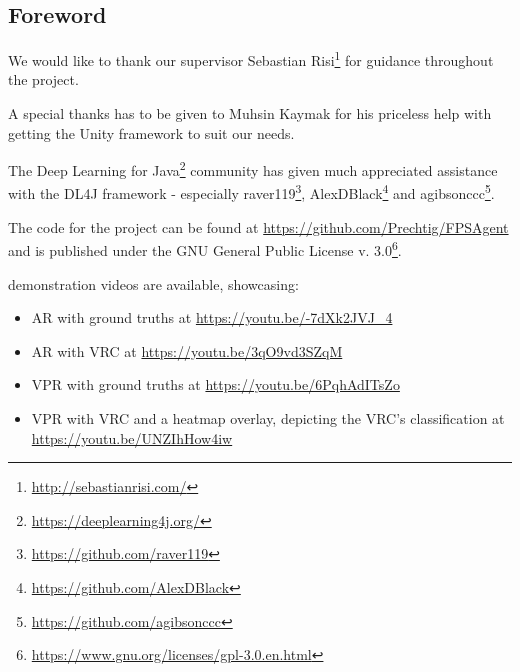 
\begin{center}
\section*{Foreword}
\vspace{1em}
\end{center}


\noindent
We would like to thank our supervisor Sebastian Risi\footnote{\url{http://sebastianrisi.com/}} for guidance throughout the project.

A special thanks has to be given to Muhsin Kaymak for his priceless help with getting the Unity framework to suit our needs.

The Deep Learning for Java\footnote{\url{https://deeplearning4j.org/}} community has given much appreciated assistance with the DL4J framework - especially raver119\footnote{\url{https://github.com/raver119}}, AlexDBlack\footnote{\url{https://github.com/AlexDBlack}} and agibsonccc\footnote{\url{https://github.com/agibsonccc}}.

\vspace{5mm}

\noindent
The code for the project can be found at \url{https://github.com/Prechtig/FPSAgent} and is published under the GNU General Public License v. 3.0\footnote{\url{https://www.gnu.org/licenses/gpl-3.0.en.html}}.

\vspace{5mm}

 demonstration videos are available, showcasing:
\begin{itemize}
  \item AR with ground truths at \url{https://youtu.be/-7dXk2JVJ_4}
  \item AR with VRC at \url{https://youtu.be/3qO9vd3SZqM}
  \item VPR with ground truths at \url{https://youtu.be/6PqhAdITsZo}
  \item VPR with VRC and a heatmap overlay, depicting the VRC's classification at \url{https://youtu.be/UNZIhHow4iw} 
\end{itemize}

\restoregeometry









